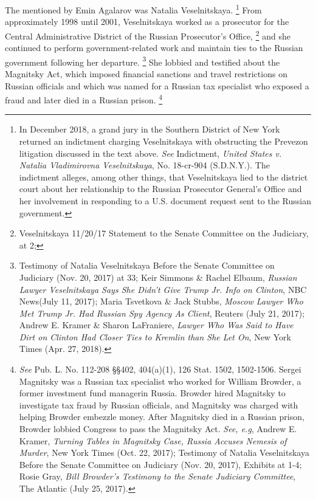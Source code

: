 The  mentioned by Emin Agalarov was Natalia Veselnitskaya.%
\footnote{In December 2018, a grand jury in the Southern District of New York returned an indictment charging Veselnitskaya with obstructing the Prevezon litigation discussed in the text above.
\textit{See} Indictment, \textit{United States v. Natalia Vladimirovna Veselnitskaya}, No. 18-cr-904 (S.D.N.Y.).
The indictment alleges, among other things, that Veselnitskaya lied to the district court about her relationship to the Russian Prosecutor General’s Office and her involvement in responding to a U.S. document request sent to the Russian government.}
From approximately 1998 until 2001, Veselnitskaya worked as a prosecutor for the Central Administrative District of the Russian Prosecutor's Office,%
\footnote{Veselnitskaya 11/20/17 Statement to the Senate Committee on the Judiciary, at 2;
}
and she continued to perform government-related work and maintain ties to the Russian government following her departure.%
\footnote{Testimony of Natalia Veselnitskaya Before the Senate Committee on Judiciary (Nov. 20, 2017) at 33;
Keir Simmons \& Rachel Elbaum, \textit{Russian Lawyer Veselnitskaya Says She Didn’t Give Trump Jr. Info on Clinton}, NBC News(July 11, 2017);
Maria Tsvetkova \& Jack Stubbs, \textit{Moscow Lawyer Who Met Trump Jr. Had Russian Spy Agency As Client}, Reuters (July 21, 2017);
Andrew E. Kramer \& Sharon LaFraniere, \textit{Lawyer Who Was Said to Have Dirt on Clinton Had Closer Ties to Kremlin than She Let On}, New York Times (Apr. 27, 2018).}
She lobbied and testified about the Magnitsky Act, which imposed financial sanctions and travel restrictions on Russian officials and which was named for a Russian tax specialist who exposed a fraud and later died in a Russian prison.%
\footnote{\textit{See} Pub. L. No. 112-208 \S\S 402, 404(a)(1), 126 Stat. 1502, 1502-1506.
Sergei Magnitsky was a Russian tax specialist who worked for William Browder, a former investment fund managerin Russia.
Browder hired Magnitsky to investigate tax fraud by Russian officials, and Magnitsky was charged with helping Browder embezzle money.
After Magnitsky died in a Russian prison, Browder lobbied Congress to pass the Magnitsky Act.
\textit{See, e.g}, Andrew E. Kramer, \textit{Turning Tables in Magnitsky Case, Russia Accuses Nemesis of Murder}, New York Times (Oct. 22, 2017);
Testimony of Natalia Veselnitskaya Before the Senate Committee on Judiciary (Nov. 20, 2017), Exhibits at 1-4;
Rosie Gray, \textit{Bill Browder’s Testimony to the Senate Judiciary Committee}, The Atlantic (July 25, 2017).}
